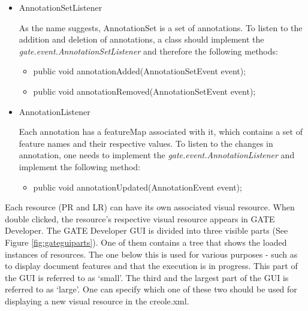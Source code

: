 \begin{itemize}
\item{AnnotationSetListener}

	As the name suggests, AnnotationSet is a set of
	annotations. To listen to the addition and deletion of annotations, a
	class should implement the \textit{gate.event.AnnotationSetListener} and
	therefore the following methods:

	\begin{itemize}
	\item{public void annotationAdded(AnnotationSetEvent event);}
	\item{public void annotationRemoved(AnnotationSetEvent event);}
	\end{itemize}

\item{AnnotationListener}

	Each annotation has a featureMap associated with it, which contains a
	set of feature names and their respective values. To listen to the
	changes in annotation, one needs to implement the
	\textit{gate.event.AnnotationListener} and implement the following
	method:

	\begin{itemize}
	\item{public void annotationUpdated(AnnotationEvent event);}
	\end{itemize}

\end{itemize}



Each resource (PR and LR) can have its own associated visual
resource. When double clicked, the resource's respective visual
resource appears in GATE Developer.  The GATE Developer GUI is divided
into three visible parts (See Figure
\ref{fig:gateguiparts}). One of them contains a tree that shows the loaded
instances of resources. The one below this is used for various purposes - such
as to display document features and that the execution is in progress. This part
of the GUI is referred to as `small'. The third and the largest part of the GUI is
referred to as `large'. One can specify which one of these two should be used for
displaying a new visual resource in the creole.xml.

\begin{figure*}
\caption{GATE GUI} 
\label{fig:gateguiparts}
\end{figure*}

